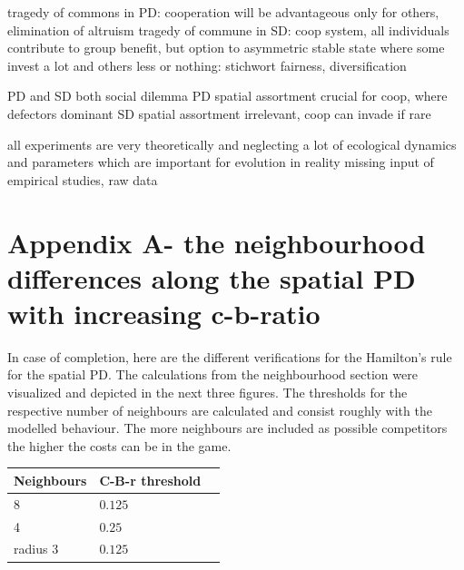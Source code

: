 \documentclass[DIV=calc, paper=a4, fontsize=11pt, twocolumn]{scrartcl}	 %
\begin{document}
tragedy of commons in PD: cooperation will be advantageous only for others, elimination of altruism 
tragedy of commune in SD: coop system, all individuals contribute to group benefit, but option to asymmetric stable state where some invest a lot and others less or nothing: stichwort fairness, diversification

PD and SD both social dilemma
PD spatial assortment crucial for coop, where defectors dominant
SD spatial assortment irrelevant, coop can invade if rare

all experiments are very theoretically and neglecting a lot of ecological dynamics and parameters which are important for evolution in reality
missing input of empirical studies, raw data

\section*{Appendix A- the neighbourhood differences along the spatial PD with increasing c-b-ratio}

In case of completion, here are the different verifications for the Hamilton's rule for the spatial PD. The calculations from the neighbourhood section were visualized and depicted in the next three figures. The thresholds for the respective number of neighbours are calculated and consist roughly with the modelled behaviour. The more neighbours are included as possible competitors the higher the costs can be in the game. 

\begin{tabular}{l|ll}
\centering
Neighbours & C-B-r threshold\\
\midrule
8 & $0.125$  \\
4 & $0.25$  \\
radius 3 & $ 0.125$ \\
\end{tabular}
\end{document}
